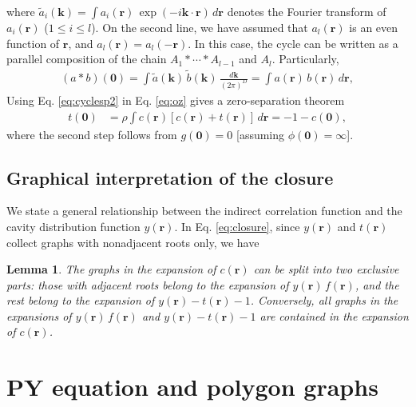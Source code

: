 \documentclass[preprint]{revtex4-1}
\newtheorem{lemm}[thrm]{Lemma}
\newcommand{\vct}[1]{\mathbf{#1}}
\providecommand{\vr}{} %
\renewcommand{\vr}{\vct{r}}
\newcommand{\vk}{\vct{k}}
\newcommand{\dvk}{\frac{d\vk}{(2\pi)^D}}
\begin{document}
%
where
  $\tilde{a}_i(\vk) = \int a_i(\vr) \, \exp(-i \vk \cdot \vr) \, d\vr$
  denotes the Fourier transform of $a_i(\vr)$ ($1 \le i \le l$).
%
On the second line,
  we have assumed that
  $a_l(\vr)$ is an even function of $\vr$,
  and
  $a_l(\vr) = a_l(-\vr)$.
%
In this case,
  the cycle can be written as a parallel composition
  of the chain $A_1 * \cdots * A_{l-1}$ and $A_l$.
%
Particularly,
%
\begin{align}
      (a * b)(\vct{0})
  =
      \int \tilde{a}(\vk) \, \tilde{b}(\vk) \, \dvk
  =
      \int a(\vr) \, b(\vr) \, d\vr,
\label{eq:cyclesp2}
\end{align}
%
Using Eq. \eqref{eq:cyclesp2} in Eq. \eqref{eq:oz} gives
  a zero-separation theorem\cite{rosenfeld1979}
%
\begin{align}
  t(\vct{0})
  &= \rho \int c(\vr) [c(\vr) + t(\vr)] \, d\vr
  = -1 - c(\vct{0}),
\label{eq:zerosep}
\end{align}
%
where the second step follows from
  $g(\vct{0}) = 0$ [assuming $\phi(\vct{0}) = \infty$].





\subsection{Graphical interpretation of the closure}



We state a general relationship between the indirect correlation function
  and the cavity distribution function $y(\vr)$.
%
In Eq. \eqref{eq:closure},
since $y(\vr)$ and $t(\vr)$
collect graphs with nonadjacent roots only,
we have
%
\begin{lemm}
The graphs in the expansion of $c(\vr)$
  can be split into two exclusive parts:
  those with adjacent roots belong to
  the expansion of $y(\vr)\, f(\vr)$,
  and the rest belong to
  the expansion of $y(\vr) - t(\vr) - 1$.
%
Conversely,
  all graphs in the expansions of $y(\vr) \, f(\vr)$
  and $y(\vr) - t(\vr) - 1$
  are contained in the expansion of $c(\vr)$.
\label{thm:crsplit}
\end{lemm}
%





\section{\label{sec:py}PY equation and polygon graphs}
\end{document}
